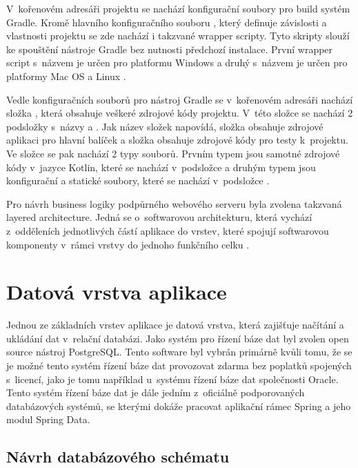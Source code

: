 V~kořenovém adresáři projektu se nachází konfigurační soubory pro build systém Gradle. Kromě hlavního konfiguračního souboru , který definuje závislosti a vlastnosti projektu se zde nachází i takzvané wrapper scripty. Tyto skripty slouží ke spouštění nástroje Gradle bez nutnosti předchozí instalace. První wrapper script s~názvem  je určen pro platformu Windows a druhý s~názvem  je určen pro platformy Mac OS a Linux \cite[kap. 3.4]{muschko_gradle_2014}.

Vedle konfiguračních souborů pro nástroj Gradle se v~kořenovém adresáři nachází složka , která obsahuje veškeré zdrojové kódy projektu. V~této složce se nachází 2 podsložky s~názvy  a . Jak název složek napovídá, složka  obsahuje zdrojové aplikaci pro hlavní balíček a složka  obsahuje zdrojové kódy pro testy k~projektu. Ve složce  se pak nachází 2 typy souborů. Prvním typem jsou samotné zdrojové kódy v~jazyce Kotlin, které se nachází v~podsložce  a druhým typem jsou konfigurační a statické soubory, které se nachází v~podsložce .

Pro návrh business logiky podpůrného webového serveru byla zvolena takzvaná layered architecture. Jedná se o~softwarovou architekturu, která vychází z~odděleních jednotlivých částí aplikace do vrstev, které spojují softwarovou komponenty v~rámci vrstvy do jednoho funkčního celku \cite{richards_software_architecture_patterns_2015}.

\section{Datová vrstva aplikace}

Jednou ze základních vrstev aplikace je datová vrstva, která zajišťuje načítání a ukládání dat v~relační databázi.
Jako systém pro řízení báze dat byl zvolen open source nástroj PostgreSQL. Tento software byl vybrán primárně kvůli tomu, že se je možné tento systém řízení báze dat provozovat zdarma bez poplatků spojených s~licencí, jako je tomu například u~systému řízení báze dat společnosti Oracle. Tento systém řízení báze dat je dále jedním z~oficiálně podporovaných databázových systémů, se kterými dokáže pracovat aplikační rámec Spring a jeho modul Spring Data.

\subsection{Návrh databázového schématu}

